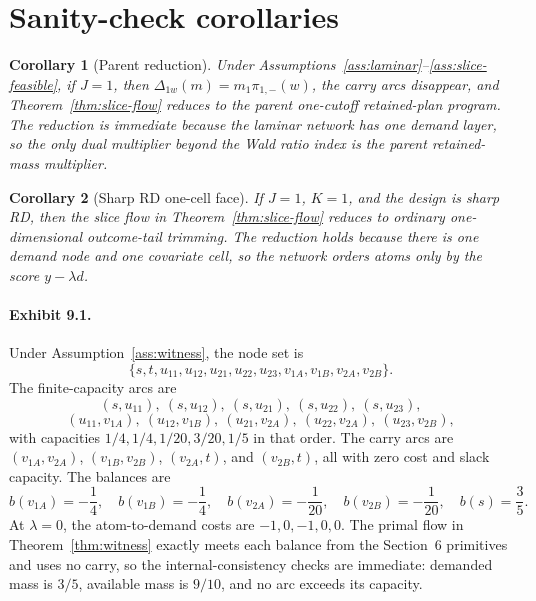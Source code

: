 \documentclass[11pt]{article}
\theoremstyle{definition}
\theoremstyle{plain}
\newtheorem{corollary}{Corollary}
\theoremstyle{remark}
\begin{document}
\section{Sanity-check corollaries}
\begin{corollary}[Parent reduction]\label{cor:parent}
Under Assumptions~\ref{ass:laminar}--\ref{ass:slice-feasible}, if \(J=1\), then
\(\Delta_{1w}(m)=m_1\pi_{1,-}(w)\), the carry arcs disappear, and
Theorem~\ref{thm:slice-flow} reduces to the parent one-cutoff retained-plan program. The
reduction is immediate because the laminar network has one demand layer, so the only dual
multiplier beyond the Wald ratio index is the parent retained-mass multiplier.
\end{corollary}

\begin{corollary}[Sharp RD one-cell face]\label{cor:onecell}
If \(J=1\), \(K=1\), and the design is sharp RD, then the slice flow in
Theorem~\ref{thm:slice-flow} reduces to ordinary one-dimensional outcome-tail trimming.
The reduction holds because there is one demand node and one covariate cell, so the network
orders atoms only by the score \(y-\lambda d\).
\end{corollary}

\paragraph{Exhibit 9.1.}
Under Assumption~\ref{ass:witness}, the node set is
\[
\{s,t,u_{11},u_{12},u_{21},u_{22},u_{23},v_{1A},v_{1B},v_{2A},v_{2B}\}.
\]
The finite-capacity arcs are
\[
(s,u_{11}),\ (s,u_{12}),\ (s,u_{21}),\ (s,u_{22}),\ (s,u_{23}),
\]
\[
(u_{11},v_{1A}),\ (u_{12},v_{1B}),\ (u_{21},v_{2A}),\ (u_{22},v_{2A}),\ (u_{23},v_{2B}),
\]
with capacities \(1/4,1/4,1/20,3/20,1/5\) in that order. The carry arcs are
\((v_{1A},v_{2A})\), \((v_{1B},v_{2B})\), \((v_{2A},t)\), and \((v_{2B},t)\), all with
zero cost and slack capacity. The balances are
\[
b(v_{1A})=-\frac14,\quad b(v_{1B})=-\frac14,\quad
b(v_{2A})=-\frac1{20},\quad b(v_{2B})=-\frac1{20},\quad
b(s)=\frac35.
\]
At \(\lambda=0\), the atom-to-demand costs are \(-1,0,-1,0,0\). The primal flow in
Theorem~\ref{thm:witness} exactly meets each balance from the Section~6 primitives and
uses no carry, so the internal-consistency checks are immediate: demanded mass is \(3/5\),
available mass is \(9/10\), and no arc exceeds its capacity.
\end{document}

